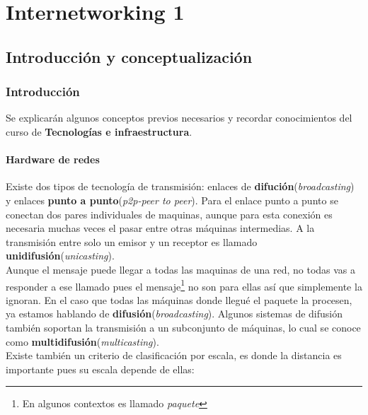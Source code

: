 \documentclass[
	11pt, %
	fleqn, %
	a4paper, %
]{LegrandOrangeBook}
\begin{document}
\part{Internetworking 1}
\chapter{Introducción y conceptualización}
\section{Introducción}
Se explicarán algunos conceptos previos necesarios y recordar conocimientos del curso de \textbf{Tecnologías e infraestructura}.
\subsection{Hardware de redes}
Existe dos tipos de tecnología de transmisión: enlaces de \textbf{difución}(\textit{broadcasting}) y enlaces \textbf{punto a punto}(\textit{p2p-peer to peer}). Para el enlace punto a punto se conectan dos pares individuales de maquinas, aunque para esta conexión es necesaria muchas veces el pasar entre otras máquinas intermedias. A la transmisión entre solo un emisor y un receptor es llamado \textbf{unidifusión}(\textit{unicasting}).\\
Aunque el mensaje puede llegar a todas las maquinas de una red, no todas vas a responder a ese llamado pues el mensaje\footnote{En algunos contextos es llamado \textit{paquete}} no son para ellas así que simplemente la ignoran. En el caso que todas las máquinas donde llegué el paquete la procesen, ya estamos hablando de \textbf{difusión}(\textit{broadcasting}). Algunos sistemas de difusión también soportan la transmisión a
un subconjunto de máquinas, lo cual se conoce como \textbf{multidifusión}(\textit{multicasting}).\\
Existe también un criterio de clasificación por escala, es donde la distancia es importante pues su escala depende de ellas:
\end{document}
